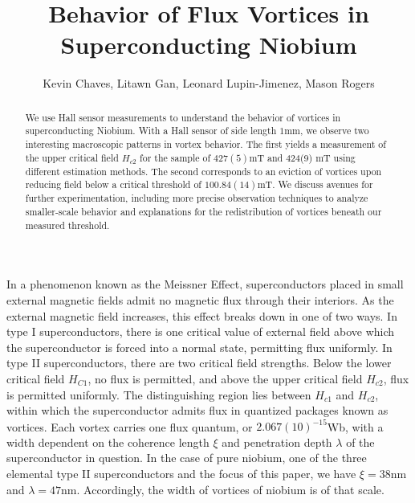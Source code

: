 \documentclass[twocolumn,aps,prl]{revtex4-1} %
\begin{document}
\title{Behavior of Flux Vortices in Superconducting Niobium}

\author{Kevin Chaves, Litawn Gan, Leonard Lupin-Jimenez, Mason Rogers}


\begin{abstract}
We use Hall sensor measurements to understand the behavior of vortices in superconducting Niobium. With a Hall sensor of side length $1$mm, we observe two interesting macroscopic patterns in vortex behavior. The first yields a measurement of the upper critical field $H_{c2}$ for the sample of $427(5)$mT and 424(9) mT using different estimation methods. The second corresponds to an eviction of vortices upon reducing field below a critical threshold of $100.84(14)$mT. We discuss avenues for further experimentation, including more precise observation techniques to analyze smaller-scale behavior and explanations for the redistribution of vortices beneath our measured threshold.
\end{abstract}
\maketitle

In a phenomenon known as the Meissner Effect, superconductors placed in small external magnetic fields admit no magnetic flux through their interiors. As the external magnetic field increases, this effect breaks down in one of two ways. In type I superconductors, there is one critical value of external field above which the superconductor is forced into a normal state, permitting flux uniformly. In type II superconductors, there are two critical field strengths. Below the lower critical field $H_{C1}$, no flux is permitted, and above the upper critical field $H_{c2}$, flux is permitted uniformly. The distinguishing region lies between $H_{c1}$ and $H_{c2}$, within which the superconductor admits flux in quantized packages known as vortices. Each vortex carries one flux quantum, or $2.067(10)^{-15}$Wb, with a width dependent on the coherence length $\xi$ and penetration depth $\lambda$ of the superconductor in question. In the case of pure niobium, one of the three elemental type II superconductors and the focus of this paper, we have $\xi = 38$nm and $\lambda = 47$nm. Accordingly, the width of vortices of niobium is of that scale.
\end{document}
